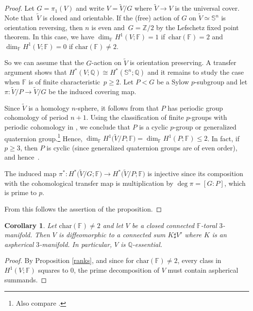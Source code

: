 \documentclass[10pt,a4paper]{amsart}
\numberwithin{equation}{section}
\newtheorem{Corollary}[Theorem]{Corollary}
\newcommand{\F}{\mathbb{F}}
\newcommand{\Z}{\mathbb{Z}}
\newcommand{\SSS}{\mathbb{S}}
\newcommand{\charac}{\mathrm{char}}
\begin{document}
\begin{proof} Let $G = \pi_1(V)$ and write $V = \tilde V / G$ where $\tilde V \to V$ is the universal cover.
Note that~$\tilde V$ is closed and orientable.
If the (free) action of $G$ on $\tilde V \simeq \SSS^n$ is orientation reversing, then $n$ is even and~${G = \Z/2}$ by the Lefschetz fixed point theorem.
In this case, we have $\dim_{\F} H^1(V ; \F) = 1$ if~${\charac(\F) = 2}$ and $\dim_{\F} H^1(V ; \F) = 0$ if $\charac(\F) \neq 2$.

So we can assume that the $G$-action on $\tilde V$ is orientation preserving.
A transfer argument shows that $H^*(V; \mathbb{Q}) \cong H^*(\SSS^n ; \mathbb{Q})$ and it remains to study the case when $\F$ is of finite characteristic~${p \geq 2}$.
Let $P < G$ be a Sylow $p$-subgroup and let $\pi \colon \tilde V / P \to \tilde V / G$ be the induced covering map.

Since $\tilde V$ is a homology $n$-sphere, it follows from \cite[Section XVI.9, Application 4]{C-E1956} that $P$ has periodic group cohomology of period $n+1$.
Using the classification of finite $p$-groups with periodic cohomology in \cite[Theorem XII.11.6]{C-E1956},
we conclude that $P$ is a cyclic $p$-group or generalized quaternion group.\footnote{Also compare \cite[Chapter IV.6]{Adem-Milgram}.}
Hence, $\dim_{\F} H^1\big(\tilde V / P; \F\big) = \dim_{\F} H^1(P ; \F) \leq 2$.
In fact, if~${p \geq 3}$, then $P$ is cyclic (since generalized quaternion groups are of even order), and hence~\smash{$\dim_{\F} H^1\big(\tilde V / P ; \F\big) \leq 1$}.

The induced map $\pi^* \colon H^*\big(\tilde V / G; \F\big) \to H^*\big(\tilde V / P ; \F\big)$ is injective since its composition with the cohomological transfer map \smash{$H^*\big(\tilde V / P; \F\big) \to H^*\big(\tilde V / G; \F\big)$} is multiplication by $\deg \pi = [G:P]$, which is prime to $p$.

From this follows the assertion of the proposition.
 \end{proof}

 \begin{Corollary} \label{cor:asphthree} Let $\charac(\F) \neq 2$ and let $V$ be a closed connected $\F$-toral $3$-manifold.
Then $V$ is diffeomorphic to a connected sum $K \sharp V'$ where $K$ is an aspherical $3$-manifold.
In particular, $V$ is $\mathbb{Q}$-essential.
\end{Corollary}

 \begin{proof}
By Proposition \ref{ranks}, and since for $\charac (\F) \neq 2$, every class in $H^1(V; \F)$ squares to $0$, the prime decomposition of $V$ must contain aspherical summands.
\end{proof}
\end{document}
